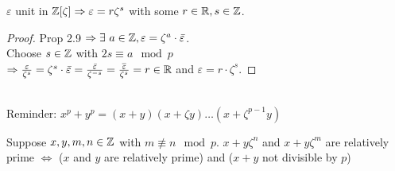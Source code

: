 \begin{Kor}
$\varepsilon$ unit in $\mathbb{Z}[\zeta] \Rightarrow \varepsilon = r  \zeta^s$ with some $r \in \mathbb{R}, s \in \mathbb{Z}$.
\end{Kor}
\begin{proof}
Prop 2.9 $\Rightarrow \exists \ a \in \mathbb{Z}, \varepsilon= \zeta^a \cdot \bar{\varepsilon}$.\\
Choose $s \in \mathbb{Z}$ with $2s \equiv a \mod p$\\
$\Rightarrow \frac{\varepsilon}{\zeta^s} = \zeta^s \cdot \bar{\varepsilon} = \frac{\bar{\varepsilon}}{\zeta^{-s}} = \bar{\frac{\varepsilon}{\zeta^s}}=r \in \mathbb{R}$ and $\varepsilon = r\cdot \zeta^s$.
\end{proof}
\hrulefill\\
Reminder: $x^p+y^p= (x+y)(x+\zeta y) \dots (x+\zeta^{p-1}y)$
\begin{Lem}
Suppose $x,y,m,n \in \mathbb{Z}$ with $m \not \equiv n \mod p$.
$x+y\zeta^n$ and $x+y\zeta^m$ are relatively prime $\iff$ ($x$ and $y$ are relatively prime) and ($x+y$ not divisible by $p$)
\end{Lem}

